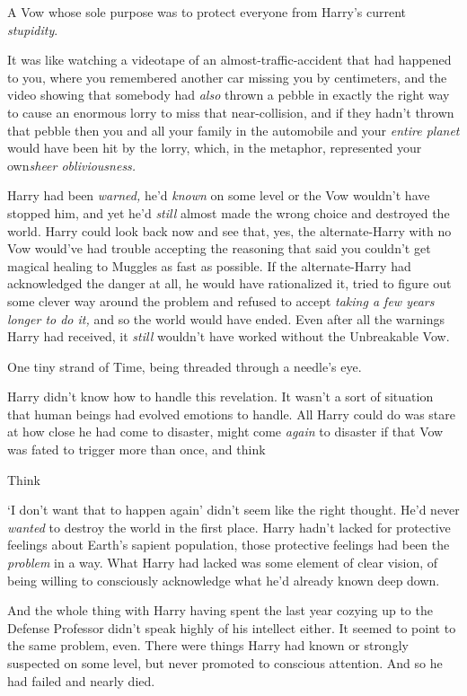 A Vow whose sole purpose was to protect everyone from Harry's current
\emph{stupidity}.

It was like watching a videotape of an almost-traffic-accident that had
happened to you, where you remembered another car missing you by centimeters,
and the video showing that somebody had \emph{also} thrown a pebble in exactly
the right way to cause an enormous lorry to miss that near-collision, and if
they hadn't thrown that pebble then you and all your family in the automobile
and your \emph{entire planet} would have been hit by the lorry, which, in the
metaphor, represented your own\emph{sheer obliviousness.}

Harry had been \emph{warned,} he'd \emph{known} on some level or the Vow
wouldn't have stopped him, and yet he'd \emph{still} almost made the wrong
choice and destroyed the world. Harry could look back now and see that, yes,
the alternate-Harry with no Vow would've had trouble accepting the reasoning
that said you couldn't get magical healing to Muggles as fast as possible. If
the alternate-Harry had acknowledged the danger at all, he would have
rationalized it, tried to figure out some clever way around the problem and
refused to accept \emph{taking a few years longer to do it,} and so the world
would have ended. Even after all the warnings Harry had received, it
\emph{still} wouldn't have worked without the Unbreakable Vow.

One tiny strand of Time, being threaded through a needle's eye.

Harry didn't know how to handle this revelation. It wasn't a sort of situation
that human beings had evolved emotions to handle. All Harry could do was stare
at how close he had come to disaster, might come \emph{again} to disaster if
that Vow was fated to trigger more than once, and think{\el}

Think{\el}

`I don't want that to happen again' didn't seem like the right thought. He'd
never \emph{wanted} to destroy the world in the first place. Harry hadn't
lacked for protective feelings about Earth's sapient population, those
protective feelings had been the \emph{problem} in a way. What Harry had lacked
was some element of clear vision, of being willing to consciously acknowledge
what he'd already known deep down.

And the whole thing with Harry having spent the last year cozying up to the
Defense Professor didn't speak highly of his intellect either. It seemed to
point to the same problem, even. There were things Harry had known or strongly
suspected on some level, but never promoted to conscious attention. And so he
had failed and nearly died.

